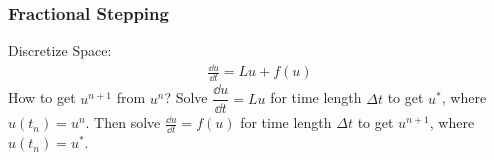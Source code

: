 \documentclass{article}
\newcommand{\Dt}{\Delta t}
\begin{document}
        \subsubsection{Fractional Stepping}
            Discretize Space:
            \begin{align*}
                \frac{\dd u}{\dd t} = Lu + f(u)
            \end{align*}
            How to get $u^{n+1}$ from $u^n$?  Solve $\dfrac{\dd u}{\dd t} = Lu$ for time length $\Dt$ to get $u^*$, where $u(t_n) = u^n$.  Then solve $\frac{\dd u}{\dd t} = f(u)$ for time length $\Dt$ to get $u^{n+1}$, where $u(t_n) = u^*$.
\end{document}
